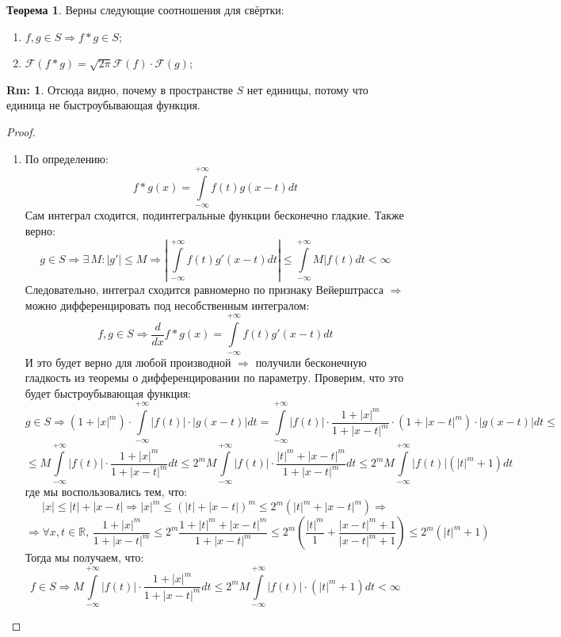 \documentclass[12pt]{article}
\newcommand{\MR}{\mathbb{R}}
\theoremstyle{definition}
\newtheorem{rem}{Rm:}
\newtheorem{theorem}{Теорема}
\newcommand{\ddint}[2]{\displaystyle\int\limits_{#1}^{#2}}
\newcommand{\fourt}[1]{\mathcal{F}\left(#1\right)}
\begin{document}
\begin{theorem} Верны следующие соотношения для свёртки:
	\begin{enumerate}[label=\arabic*)]
		\item $f, g \in S \Rightarrow f*g \in S$;
		\item $\fourt{f*g} = \sqrt{2\pi}\fourt{f}{\cdot}\fourt{g}$;
	\end{enumerate}
\end{theorem}
\begin{rem}
	Отсюда видно, почему в пространстве $S$ нет единицы, потому что единица не быстроубывающая функция.
\end{rem}
\begin{proof}\hfill
	\begin{enumerate}[label=\arabic*)]
		\item По определению:
		$$
			f*g(x) = \ddint{-\infty}{+\infty}f(t)g(x-t)dt
		$$
		Сам интеграл сходится, подинтегральные функции бесконечно гладкие. Также верно:
		$$
			g \in S \Rightarrow \exists \, M \colon |g'| \leq M \Rightarrow \left|\,\ddint{-\infty}{+\infty}f(t)g'(x-t)dt\right| \leq \ddint{-\infty}{+\infty}M|f(t)dt < \infty
		$$
		Следовательно, интеграл сходится равномерно по признаку Вейерштрасса $\Rightarrow$ можно дифференцировать под несобственным интегралом:
		$$
			f,g \in S \Rightarrow \dfrac{d}{dx}f*g(x) = \ddint{-\infty}{+\infty}f(t)g'(x-t)dt
		$$
		И это будет верно для любой производной $\Rightarrow$ получили бесконечную гладкость из теоремы о дифференцировании по параметру. Проверим, что это будет быстроубывающая функция:
		$$
			g \in S \Rightarrow (1 + |x|^m){\cdot}\ddint{-\infty}{+\infty}|f(t)|{\cdot}|g(x - t)|dt = \ddint{-\infty}{+\infty}|f(t)|{\cdot}\dfrac{1 + |x|^m}{1 + |x -t|^m}{\cdot}(1 + |x-t|^m){\cdot}|g(x-t)|dt \leq 
		$$
		$$
			\leq M\ddint{-\infty}{+\infty}|f(t)|{\cdot}\dfrac{1 + |x|^m}{1 + |x -t|^m}dt \leq 2^mM\ddint{-\infty}{+\infty}|f(t)|{\cdot}\dfrac{|t|^m + |x-t|^m}{1 + |x-t|^m}dt \leq 2^mM \ddint{-\infty}{+\infty}|f(t)|(|t|^m+1)dt
		$$
		где мы воспользовались тем, что:
		$$
			|x| \leq |t| + |x - t| \Rightarrow |x|^m \leq (|t| + |x - t|)^m \leq 2^m(|t|^m + |x-t|^m) \Rightarrow
		$$
		$$
			\Rightarrow \forall x,t \in \MR, \, \dfrac{1 + |x|^m}{1 + |x -t|^m} \leq 2^m\dfrac{1 + |t|^m + |x-t|^m}{1 + |x-t|^m}\leq 2^m\left(\dfrac{|t|^m}{1} + \dfrac{|x-t|^m+ 1}{|x-t|^m + 1}\right) \leq 2^m(|t|^m + 1)
		$$
		Тогда мы получаем, что: 
		$$
			f \in S \Rightarrow M\ddint{-\infty}{+\infty}|f(t)|{\cdot}\dfrac{1 + |x|^m}{1 + |x -t|^m}dt \leq 2^mM \ddint{-\infty}{+\infty}|f(t)|{\cdot}(|t|^m+1)dt < \infty
$$
\end{enumerate}
\end{proof}
\end{document}

